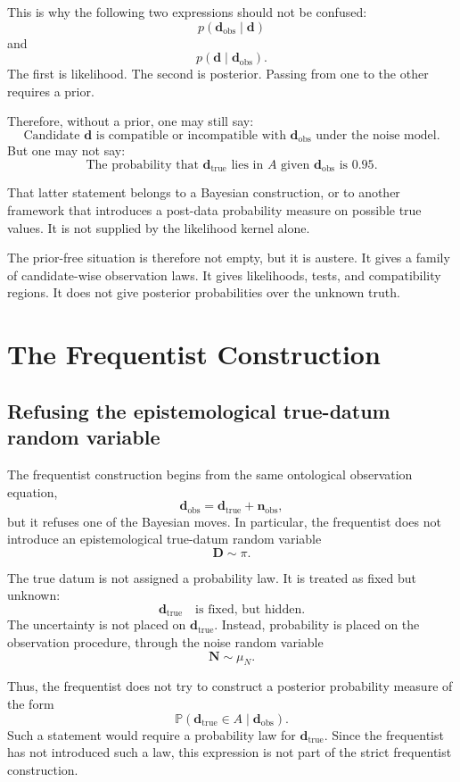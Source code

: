 \documentclass[11pt]{article}
\newcommand{\muN}{\mu_N}
\newcommand{\prior}{\pi}
\newcommand{\Drand}{\mathbf D}
\newcommand{\Nrand}{\mathbf N}
\newcommand{\dtrue}{\mathbf d_{\mathrm{true}}}
\newcommand{\dobs}{\mathbf d_{\mathrm{obs}}}
\newcommand{\nobs}{\mathbf n_{\mathrm{obs}}}
\newcommand{\Prob}{\mathbb P}
\begin{document}
This is why the following two expressions should not be confused:
\[
    p(\dobs\mid \mathbf d)
\]
and
\[
    p(\mathbf d\mid \dobs).
\]
The first is likelihood. The second is posterior. Passing from one to the other requires a prior.

Therefore, without a prior, one may still say:
\[
    \text{Candidate } \mathbf d
    \text{ is compatible or incompatible with } \dobs
    \text{ under the noise model.}
\]
But one may not say:
\[
    \text{The probability that } \dtrue
    \text{ lies in } A
    \text{ given } \dobs
    \text{ is } 0.95.
\]

That latter statement belongs to a Bayesian construction, or to another framework that introduces a post-data probability measure on possible true values. It is not supplied by the likelihood kernel alone.

The prior-free situation is therefore not empty, but it is austere. It gives a family of candidate-wise observation laws. It gives likelihoods, tests, and compatibility regions. It does not give posterior probabilities over the unknown truth.


\section{The Frequentist Construction}

\subsection{Refusing the epistemological true-datum random variable}

The frequentist construction begins from the same ontological observation equation,
\[
    \dobs=\dtrue+\nobs,
\]
but it refuses one of the Bayesian moves. In particular, the frequentist does not introduce an epistemological true-datum random variable
\[
    \Drand\sim\prior.
\]

The true datum is not assigned a probability law. It is treated as fixed but unknown:
\[
    \dtrue
    \quad
    \text{is fixed, but hidden.}
\]
The uncertainty is not placed on \(\dtrue\). Instead, probability is placed on the observation procedure, through the noise random variable
\[
    \Nrand\sim\muN.
\]

Thus, the frequentist does not try to construct a posterior probability measure of the form
\[
    \Prob(\dtrue\in A\mid\dobs).
\]
Such a statement would require a probability law for \(\dtrue\). Since the frequentist has not introduced such a law, this expression is not part of the strict frequentist construction.
\end{document}
